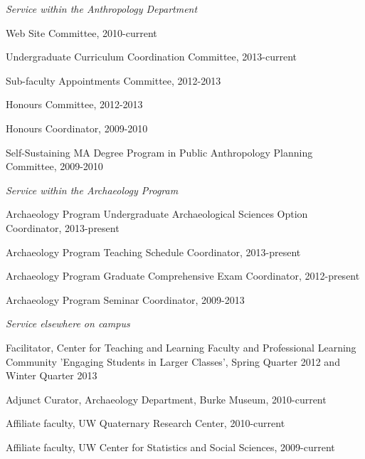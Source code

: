 
\medskip

\noindent\emph{Service within the Anthropology Department \vspace{0.01in}}

\medskip

\ind Web Site Committee, 2010-current

\ind Undergraduate Curriculum Coordination Committee, 2013-current

\ind Sub-faculty Appointments Committee, 2012-2013

\ind Honours Committee, 2012-2013

\ind Honours Coordinator, 2009-2010

\ind Self-Sustaining MA Degree Program in Public Anthropology Planning Committee, 2009-2010

\medskip

\noindent\emph{Service within the Archaeology Program \vspace{0.01in}}

\medskip

\ind Archaeology Program Undergraduate Archaeological Sciences Option Coordinator, 2013-present

\ind Archaeology Program Teaching Schedule Coordinator, 2013-present

\ind Archaeology Program Graduate Comprehensive Exam Coordinator, 2012-present

\ind Archaeology Program Seminar Coordinator, 2009-2013

 \medskip
 
 \newpage

\noindent\emph{Service elsewhere on campus\vspace{0.01in}}

\medskip

\ind Facilitator, Center for Teaching and Learning Faculty and Professional Learning Community 'Engaging Students in Larger Classes', Spring Quarter 2012 and Winter Quarter 2013

\ind Adjunct Curator, Archaeology Department, Burke Museum, 2010-current

\ind Affiliate faculty, UW Quaternary Research Center, 2010-current

\ind Affiliate faculty, UW Center for Statistics and Social Sciences, 2009-current

